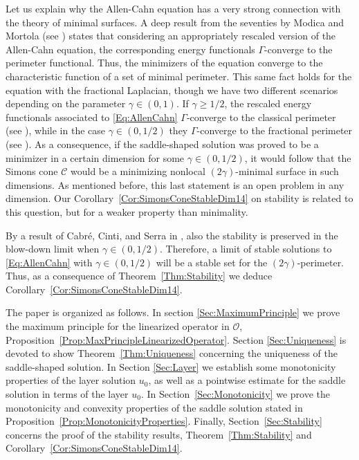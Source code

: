 \documentclass[12pt,reqno]{amsart}
\theoremstyle{definition}
\theoremstyle{remark}
\newcommand{\ccal}{\mathscr{C}}
\newcommand{\ocal}{\mathcal{O}}
\newcommand{\s}{\gamma}
\numberwithin{equation}{section}
\begin{document}
Let us explain why the Allen-Cahn equation has a very strong connection with the theory of minimal surfaces. A deep result from the seventies by Modica and Mortola (see \cite{Modica,ModicaMortola}) states that considering an appropriately rescaled version of the Allen-Cahn equation, the corresponding energy functionals $\Gamma$-converge to the perimeter functional. Thus, the minimizers of the equation converge to the characteristic function of a set of minimal perimeter. This same fact holds for the equation with the fractional Laplacian, though we have two different scenarios depending on the parameter $\s \in (0,1)$. If $\s \geq 1/2$, the rescaled energy functionals associated to \eqref{Eq:AllenCahn} $\Gamma$-converge to the classical perimeter (see \cite{GiovanniBouchitteSeppecher,Gonzalez}), while in the case $\s \in (0,1/2)$ they $\Gamma$-converge to the fractional perimeter (see \cite{SavinValdinoci-GammaConvergence}). As a consequence, if the saddle-shaped solution was proved to be a minimizer in a certain dimension for some $\s \in (0,1/2)$, it would follow that the Simons cone $\ccal$ would be a minimizing nonlocal $(2\s)$-minimal surface in such dimensions. As mentioned before, this last statement is an open problem in any dimension. Our Corollary~\ref{Cor:SimonsConeStableDim14} on stability is related to this question, but for a weaker property than minimality.

By a result of Cabré, Cinti, and Serra in \cite{CabreCintiSerra-Stable}, also the stability is preserved in the blow-down limit when $\s\in(0,1/2)$. Therefore, a limit of stable solutions to \eqref{Eq:AllenCahn} with $\s \in (0,1/2)$ will be a stable set for the $(2\s)$-perimeter. Thus, as a consequence of Theorem~\ref{Thm:Stability} we deduce Corollary~\ref{Cor:SimonsConeStableDim14}.

The paper is organized as follows. In section \ref{Sec:MaximumPrinciple} we prove the maximum principle for the linearized operator in $\ocal$, Proposition~\ref{Prop:MaxPrincipleLinearizedOperator}. Section \ref{Sec:Uniqueness} is devoted to show Theorem~\ref{Thm:Uniqueness} concerning the uniqueness of the saddle-shaped solution. In Section \ref{Sec:Layer} we establish some monotonicity properties of the layer solution $u_0$, as well as a pointwise estimate for the saddle solution in terms of the layer $u_0$. In Section~\ref{Sec:Monotonicity} we prove the monotonicity and convexity properties of the saddle solution stated in Proposition~\ref{Prop:MonotonicityProperties}. Finally, Section~\ref{Sec:Stability} concerns the proof of the stability results, Theorem~\ref{Thm:Stability} and  Corollary~\ref{Cor:SimonsConeStableDim14}.
\end{document}
